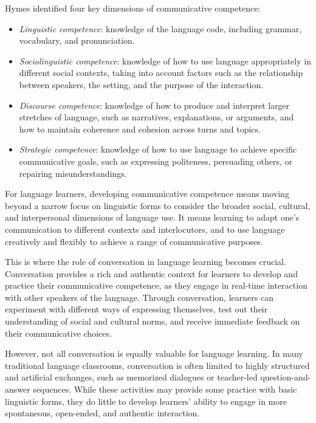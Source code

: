 Hymes identified four key dimensions of communicative competence:

\begin{itemize}[noitemsep]
    \item \textit{Linguistic competence}: knowledge of the language code, including grammar, vocabulary, and pronunciation.
    \item \textit{Sociolinguistic competence}: knowledge of how to use language appropriately in different social contexts, taking into account factors such as the relationship between speakers, the setting, and the purpose of the interaction.
    \item \textit{Discourse competence}: knowledge of how to produce and interpret larger stretches of language, such as narratives, explanations, or arguments, and how to maintain coherence and cohesion across turns and topics.
    \item \textit{Strategic competence}: knowledge of how to use language to achieve specific communicative goals, such as expressing politeness, persuading others, or repairing misunderstandings.
\end{itemize}

For language learners, developing communicative competence means moving beyond a narrow focus on linguistic forms to consider the broader social, cultural, and interpersonal dimensions of language use. It means learning to adapt one's communication to different contexts and interlocutors, and to use language creatively and flexibly to achieve a range of communicative purposes.

This is where the role of conversation in language learning becomes crucial. Conversation provides a rich and authentic context for learners to develop and practice their communicative competence, as they engage in real-time interaction with other speakers of the language. Through conversation, learners can experiment with different ways of expressing themselves, test out their understanding of social and cultural norms, and receive immediate feedback on their communicative choices.

However, not all conversation is equally valuable for language learning. In many traditional language classrooms, conversation is often limited to highly structured and artificial exchanges, such as memorized dialogues or teacher-led question-and-answer sequences. While these activities may provide some practice with basic linguistic forms, they do little to develop learners' ability to engage in more spontaneous, open-ended, and authentic interaction.

